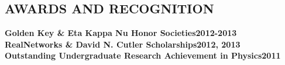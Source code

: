 \documentclass[margin,line]{resume}
\begin{document}
\begin{resume}
\sectionline

    \section{\mysidestyle \textbf{\large{A}\small{WARDS AND RECOGNITION}}}

    \textbf{Golden Key \& Eta Kappa Nu Honor Societies}\hfill \textbf{2012-2013}\\
    \textbf{RealNetworks \& David N. Cutler Scholarships}\hfill \textbf{2012, 2013}\\
    \textbf{Outstanding Undergraduate Research Achievement in Physics}\hfill \textbf{2011}

\end{resume}
\end{document}
